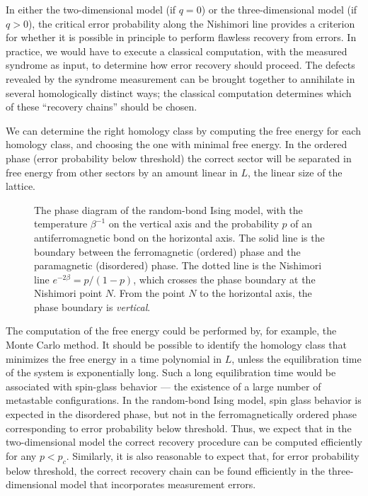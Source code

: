 In either the two-dimensional model (if $q=0$) or the three-dimensional model (if $q>0$), the critical error probability along the Nishimori line provides a criterion for whether it is possible in principle to perform
flawless recovery from errors.  In practice, we would have to execute a
classical computation, with the measured syndrome as input, to determine
how error recovery should proceed.  The defects revealed by the syndrome
measurement can be brought together to annihilate in several
homologically distinct ways; the classical computation determines which
of these ``recovery chains'' should be chosen.  

We can determine the right homology class by computing the free energy
for each homology class, and choosing the one with minimal free energy.
In the ordered phase (error probability below threshold) the correct sector 
will be separated in free energy from other sectors by an amount linear in $L$, the linear size of the lattice.

\begin{figure}
\begin{center}
\leavevmode
\epsfxsize=3.25in
\end{center}
\caption{The phase diagram of the random-bond Ising model, with the temperature $\beta^{-1}$ on the vertical axis and the probability $p$ of an antiferromagnetic bond on the horizontal axis. The solid line is the boundary between the ferromagnetic (ordered) phase and the paramagnetic (disordered) phase. The dotted line is the Nishimori line $e^{-2\beta}= p/(1-p)$, which crosses the phase boundary at the Nishimori point $N$. From the point $N$ to the horizontal axis, the phase boundary is {\em vertical}.}
\label{fig:nishi}
\end{figure}

The computation of the free energy could be performed by, for example, the Monte Carlo method. It should be possible to identify the homology class that minimizes the free energy in a time polynomial in $L$, unless the equilibration time of the
system is exponentially long.  Such a long equilibration time would be
associated with spin-glass behavior --- the existence of a large number
of metastable configurations.  In the random-bond Ising model, spin glass
behavior is expected in the disordered phase, but not in the
ferromagnetically ordered phase corresponding to error probability below
threshold.  Thus, we expect that in the two-dimensional model the
correct recovery procedure can be computed efficiently for any $p <
p_c$. Similarly, it is also reasonable to expect that, for error probability below threshold, the correct recovery chain can be found efficiently in the three-dimensional model that incorporates measurement errors.

